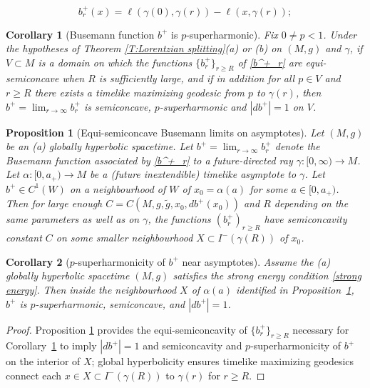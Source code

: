 \documentclass[10pt,a4paper]{amsart}
\newtheorem{corollary}{Corollary}
\newtheorem{proposition}{Proposition}
\newcommand{\re}{\color{red}}
\begin{document}
\begin{equation}\label{b^+_r}
b^+_r(x) = \ell(\gamma(0),\gamma(r))-\ell(x,\gamma(r)); %
\end{equation}

\begin{corollary}[Busemann function $b^+$ is $p$-superharmonic]
\label{L:harmonicity}
Fix $0 \ne p<1$. 
Under the hypotheses of Theorem \ref{T:Lorentzian splitting}(a) or (b) on $(M,g)$ and $\gamma$,
if $V \subset M$ is a domain on which the functions $\{b^+_r\}_{r \ge R}$ of \eqref{b^+_r} are equi-semiconcave when $R$ is sufficiently large, and if in addition %
for all $p \in V$ and $r \ge R$ there exists a timelike maximizing geodesic from $p$ to $\gamma(r)$,
then $b^+ = \lim_{r\to \infty} b^+_r$ 
is semiconcave, $p$-superharmonic and $|db^+|=1$ on $V$.
\end{corollary}

\begin{proposition}[Equi-semiconcave Busemann limits on asymptotes]\label{P:asymptotes}
Let $(M,g)$ be an (a) globally hyperbolic 
spacetime.
Let $b^+=\lim_{r \to \infty} b^+_r$ denote the Busemann function associated by \eqref{b^+_r} to a future-directed ray $\gamma:[0,\infty)\longrightarrow M$.
Let $\alpha:[0,a_+)\longrightarrow M$ be a 
(future inextendible)
timelike asymptote to $\gamma$. %
Let $b^+ \in C^1(W)$ %
on a neighbourhood of $W$ of %
$x_0=\alpha(a)$ for some $a \in [0, a_+)$. 
Then for large enough 
$C=C(M,g,\tilde g, x_0,db^+(x_0))$ and 
$R$ depending on the same parameters as well as on $\gamma$,
 the functions $(b^+_r)_{r \ge R}$ have semiconcavity constant $C$ on some smaller neighbourhood $X \subset I^-(\gamma(R))$ of $x_0$.
\end{proposition}

\begin{corollary}[$p$-superharmonicity of $b^+$ near asymptotes]
\label{C:asymptotes}
Assume the (a) globally hyperbolic spacetime $(M,g)$ satisfies the strong energy condition \eqref{strong energy}. Then 
inside the neighbourhood $X$ of $\alpha(a)$ identified in Proposition~\ref{P:asymptotes},
$b^+$ is $p$-superharmonic, semiconcave, and $|db^+|=1$.
\end{corollary}

\begin{proof}
Proposition \ref{P:asymptotes} provides the equi-semiconcavity of $\{b^+_r\}_{r \ge R}$ 
necessary for Corollary~\ref{L:harmonicity} to imply $|db^+|=1$ and semiconcavity and $p$-superharmonicity of $b^+$  on the interior of $X$;
global hyperbolicity ensures timelike maximizing geodesics connect each $x \in X \subset I^-(\gamma(R))$ to $\gamma(r)$ for $r \ge R$. 
\end{proof}
\end{document}
